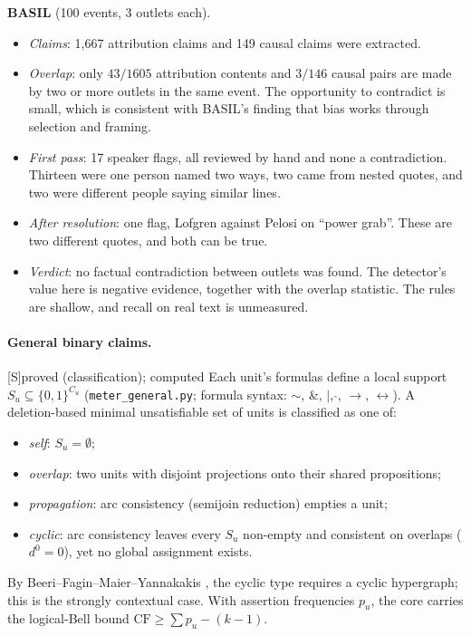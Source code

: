 \documentclass[11pt]{article}
\theoremstyle{definition}
\theoremstyle{remark}
\newcommand{\CF}{\mathrm{CF}}
\newcommand{\src}[1]{\textsf{\small[#1]}}
\newcommand{\st}[1]{\textsf{\small\color{gray}#1}}
\begin{document}
\textbf{BASIL} (100 events, 3 outlets each).
\begin{itemize}
  \item \emph{Claims}: 1{,}667 attribution claims and 149 causal claims were extracted.
  \item \emph{Overlap}: only $43/1605$ attribution contents and $3/146$ causal pairs are made by two or more outlets in the same event. The opportunity to contradict is small, which is consistent with BASIL's finding that bias works through selection and framing.
  \item \emph{First pass}: 17 speaker flags, all reviewed by hand and none a contradiction. Thirteen were one person named two ways, two came from nested quotes, and two were different people saying similar lines.
  \item \emph{After resolution}: one flag, Lofgren against Pelosi on ``power grab''. These are two different quotes, and both can be true.
  \item \emph{Verdict}: no factual contradiction between outlets was found. The detector's value here is negative evidence, together with the overlap statistic. The rules are shallow, and recall on real text is unmeasured.
\end{itemize}

\paragraph{General binary claims.}\src{S}\st{proved (classification); computed}
Each unit's formulas define a local support $S_u\subseteq\{0,1\}^{C_u}$ (\texttt{meter\_general.py}; formula syntax: $\sim$, \&, $|$, $\hat{}$, $\to$, $\leftrightarrow$). A deletion-based minimal unsatisfiable set of units is classified as one of:
\begin{itemize}
  \item \emph{self}: $S_u=\emptyset$;
  \item \emph{overlap}: two units with disjoint projections onto their shared propositions;
  \item \emph{propagation}: arc consistency (semijoin reduction) empties a unit;
  \item \emph{cyclic}: arc consistency leaves every $S_u$ non-empty and consistent on overlaps ($d^0=0$), yet no global assignment exists.
\end{itemize}
By Beeri--Fagin--Maier--Yannakakis \cite{bfmy}, the cyclic type requires a cyclic hypergraph; this is the strongly contextual case. With assertion frequencies $p_u$, the core carries the logical-Bell bound $\CF\ge\sum p_u-(k-1)$.
\end{document}
